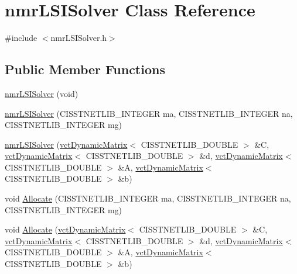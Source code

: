 \hypertarget{classnmr_l_s_i_solver}{}\section{nmr\+L\+S\+I\+Solver Class Reference}
\label{classnmr_l_s_i_solver}


{\ttfamily \#include $<$nmr\+L\+S\+I\+Solver.\+h$>$}

\subsection*{Public Member Functions}
\begin{DoxyCompactItemize}
\item 
\hyperlink{classnmr_l_s_i_solver_a33435a1ffaf867d921ef716e4c0015b6}{nmr\+L\+S\+I\+Solver} (void)
\item 
\hyperlink{classnmr_l_s_i_solver_af83ac6b15631b23cade7b4c13749c06c}{nmr\+L\+S\+I\+Solver} (C\+I\+S\+S\+T\+N\+E\+T\+L\+I\+B\+\_\+\+I\+N\+T\+E\+G\+E\+R ma, C\+I\+S\+S\+T\+N\+E\+T\+L\+I\+B\+\_\+\+I\+N\+T\+E\+G\+E\+R na, C\+I\+S\+S\+T\+N\+E\+T\+L\+I\+B\+\_\+\+I\+N\+T\+E\+G\+E\+R mg)
\item 
\hyperlink{classnmr_l_s_i_solver_a00726a765ad79e3c35b5b8a0abb23bf4}{nmr\+L\+S\+I\+Solver} (\hyperlink{classvct_dynamic_matrix}{vct\+Dynamic\+Matrix}$<$ C\+I\+S\+S\+T\+N\+E\+T\+L\+I\+B\+\_\+\+D\+O\+U\+B\+L\+E $>$ \&C, \hyperlink{classvct_dynamic_matrix}{vct\+Dynamic\+Matrix}$<$ C\+I\+S\+S\+T\+N\+E\+T\+L\+I\+B\+\_\+\+D\+O\+U\+B\+L\+E $>$ \&d, \hyperlink{classvct_dynamic_matrix}{vct\+Dynamic\+Matrix}$<$ C\+I\+S\+S\+T\+N\+E\+T\+L\+I\+B\+\_\+\+D\+O\+U\+B\+L\+E $>$ \&A, \hyperlink{classvct_dynamic_matrix}{vct\+Dynamic\+Matrix}$<$ C\+I\+S\+S\+T\+N\+E\+T\+L\+I\+B\+\_\+\+D\+O\+U\+B\+L\+E $>$ \&b)
\item 
void \hyperlink{classnmr_l_s_i_solver_af022c78f7d093cc0ba4bdbf470fbe686}{Allocate} (C\+I\+S\+S\+T\+N\+E\+T\+L\+I\+B\+\_\+\+I\+N\+T\+E\+G\+E\+R ma, C\+I\+S\+S\+T\+N\+E\+T\+L\+I\+B\+\_\+\+I\+N\+T\+E\+G\+E\+R na, C\+I\+S\+S\+T\+N\+E\+T\+L\+I\+B\+\_\+\+I\+N\+T\+E\+G\+E\+R mg)
\item 
void \hyperlink{classnmr_l_s_i_solver_ac9d1a14ba79b53b641a63f01a50f2c84}{Allocate} (\hyperlink{classvct_dynamic_matrix}{vct\+Dynamic\+Matrix}$<$ C\+I\+S\+S\+T\+N\+E\+T\+L\+I\+B\+\_\+\+D\+O\+U\+B\+L\+E $>$ \&C, \hyperlink{classvct_dynamic_matrix}{vct\+Dynamic\+Matrix}$<$ C\+I\+S\+S\+T\+N\+E\+T\+L\+I\+B\+\_\+\+D\+O\+U\+B\+L\+E $>$ \&d, \hyperlink{classvct_dynamic_matrix}{vct\+Dynamic\+Matrix}$<$ C\+I\+S\+S\+T\+N\+E\+T\+L\+I\+B\+\_\+\+D\+O\+U\+B\+L\+E $>$ \&A, \hyperlink{classvct_dynamic_matrix}{vct\+Dynamic\+Matrix}$<$ C\+I\+S\+S\+T\+N\+E\+T\+L\+I\+B\+\_\+\+D\+O\+U\+B\+L\+E $>$ \&b)

\end{DoxyCompactItemize}
